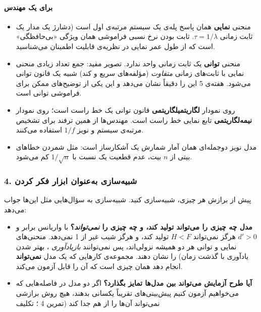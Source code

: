 \paragraph{برای یک مهندس}

\begin{itemize}
\tightlist
\item
  منحنی \textbf{نمایی} همان پاسخ پله‌ی یک سیستم مرتبه‌ی اول است (دشارژ یک
  مدار  یک ثابت زمانی \(\tau = 1/\lambda\). ثابت بودن نرخ نسبی
  فراموشی همان ویژگی «بی‌حافظگی» است که از طول عمر نمایی در نظریه‌ی قابلیت
  اطمینان می‌شناسید.
\item
  منحنی \textbf{توانی} یک ثابت زمانی واحد ندارد. تصویر مفید: جمع تعداد
  زیادی منحنی نمایی با ثابت‌های زمانی \emph{متفاوت} (مؤلفه‌های سریع و کند)
  شبیه یک قانون توانی می‌شود. هفته‌ی 5 این را دقیقاً نشان می‌دهد و این یکی
  از توضیح‌های ممکن برای فراموشی توانی است.
\item
  روی نمودار \textbf{لگاریتمی\lr{--}لگاریتمی} قانون توانی یک خط راست است؛ روی
  نمودار \textbf{نیمه‌لگاریتمی} تابع نمایی خط راست است. مهندس‌ها از همین
  ترفند برای تشخیص مرتبه‌ی سیستم و نویز \(1/f\) استفاده می‌کنند.
\item
  مدل نویز دوجمله‌ای همان آمار شمارش یک آشکارساز است: مثل شمردن خطاهای
  بیتی از \(n\) بیت، عدم قطعیت یک نسبت با \(1/\sqrt{n}\) کم می‌شود.
\end{itemize}

\subsubsection{4. شبیه‌سازی به‌عنوان ابزار فکر کردن}

پیش از برازش هر چیزی، شبیه‌سازی کنید. شبیه‌سازی به سؤال‌هایی مثل این‌ها جواب
می‌دهد:

\begin{itemize}
\tightlist
\item
  \textbf{مدل چه چیزی را می‌تواند تولید کند، و چه چیزی را
  \emph{نمی‌تواند}؟}  با واریانس برابر و \(d' > 0\) هرگز نمی‌تواند
  \(H < F\) تولید کند، و هرگز شیب  غیر از 1 نمی‌دهد. منحنی‌های
  نمایی و توانی هر دو همیشه نزولی‌اند، پس نمی‌توانند \emph{بازیادآوری}
  ، بهتر شدن یادآوری با گذشت زمان) را نشان دهند.
  مجموعه‌ی کارهایی که یک مدل \textbf{نمی‌تواند} انجام دهد همان چیزی است که
  آن را قابل آزمون می‌کند.
\item
  \textbf{آیا طرح آزمایش می‌تواند بین مدل‌ها تمایز بگذارد؟} اگر دو مدل در
  فاصله‌هایی که می‌خواهیم آزمون کنیم پیش‌بینی‌های تقریباً یکسانی بدهند، هیچ
  روش برازشی نمی‌تواند آن‌ها را از هم جدا کند (تمرین 4 ؛ تکلیف
\end{itemize}


